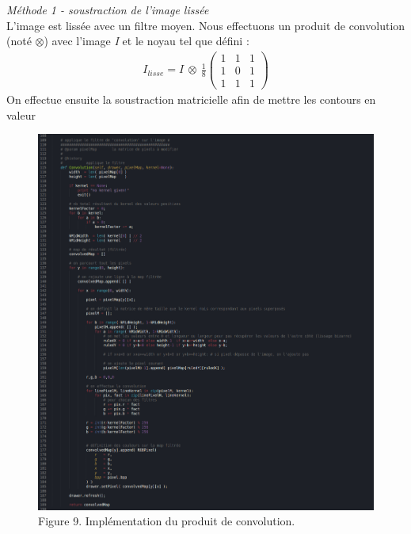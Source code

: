 \documentclass{article}
\begin{document}
			\emph{Méthode 1 - soustraction de l'image lissée}\\
			L'image est lissée avec un filtre moyen. Nous effectuons un produit de convolution (noté \begin{math}\otimes\end{math}) avec l'image \emph{I} et le noyau tel que défini :
			\begin{align*}
				I_{lisse} = I\ \otimes\ \frac{1}{8} \begin{pmatrix}
					1 & 1 & 1\\
					1 & 0 & 1\\
					1 & 1 & 1
				\end{pmatrix} 
			\end{align*}
			On effectue ensuite la soustraction matricielle afin de mettre les contours en valeur\\
			
			\begin{figure}[!h]
				\begin{center}
					\includegraphics[scale=.38]{st3/Convolution.jpg}\\
					Figure 9. Implémentation du produit de convolution.
				\end{center}
			\end{figure}
			
\end{document}
